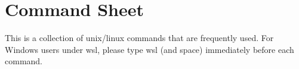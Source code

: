 \section{Command Sheet}
\label{sec:unix:linux:Command:Sheet}


This is a collection of unix/linux commands that are frequently used. 
For Windows users under wsl, please type wsl (and space) immediately before each command.





\bigskip

\clearpage

